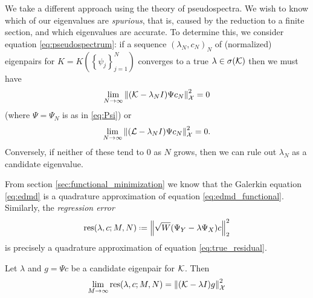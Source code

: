 We take a different approach using the theory of pseudospectra. We wish to know which of 
our eigenvalues are \emph{spurious}, that is, caused by the reduction to a finite section, 
and which eigenvalues are accurate. To determine this, we consider equation 
\ref{eq:pseudospectrum}: if a sequence $(\lambda_N, c_N)_N$ of (normalized) eigenpairs for 
$K = K(\left\{ \psi_j \right\}_{j=1}^N)$ converges to a true $\lambda \in \sigma (\mathcal{K})$ 
then we must have 
\begin{equation}
    \label{eq:true_residual}
    \lim_{N \to \infty} \left\| (\mathcal{K} - \lambda_N I) \Psi c_N \right\|_{\mathcal{X}}^2 = 0
\end{equation}
(where $\Psi = \Psi_N$ is as in \ref{eq:Psi}) or 
\begin{equation}
    \lim_{N \to \infty} \left\| (\mathcal{L} - \lambda_N I) \Psi c_N \right\|_{\mathcal{X}}^2 = 0 . 
\end{equation}
Conversely, if neither of these tend to $0$ as $N$ grows, then we can rule out 
$\lambda_N$ as a candidate eigenvalue. 

From section \ref{sec:functional_minimization} we know that the Galerkin equation 
\ref{eq:edmd} is a quadrature approximation of equation \ref{eq:edmd_functional}. 
Similarly, the \emph{regression error}
\begin{equation}
    \label{eq:res}
    \res (\lambda, c; M, N) \defeq \left\| \sqrt{W} (\YY - \lambda \YX) c \right\|_2^2
\end{equation}
is precisely a quadrature approximation of equation \ref{eq:true_residual}. 

\begin{theorem}
    \label{thm:res_M_limit}
    Let $\lambda$ and $g = \Psi c$ be a candidate eigenpair for $\mathcal{K}$. Then 
    \begin{equation}
        \lim_{M \to \infty} \text{res} (\lambda, c; M, N)
        = \left\| (\mathcal{K} - \lambda I) g \right\|_{\mathcal{X}}^2
    \end{equation}
\end{theorem}

